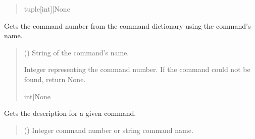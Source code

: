 \documentclass[letterpaper,10pt,english]{sphinxmanual}
\begin{document}
\begin{fulllineitems}
\begin{fulllineitems}
\begin{quote}
\begin{description}
\sphinxAtStartPar
tuple{[}int{]}|None

\end{description}\end{quote}

\end{fulllineitems}


\begin{fulllineitems}
\label{\detokenize{PodApi.Commands:PodApi.Commands.PodCommands.CommandSet.CommandNumberFromName}}
\pysigstartsignatures
{}
\pysigstopsignatures
\sphinxAtStartPar
Gets the command number from the command dictionary using the command’s name.
\begin{quote}\begin{description}
\sphinxAtStartPar
{} () \textendash{} String of the command’s name.

\sphinxAtStartPar
Integer representing the command number. If the command could not be found,                 return None.

\sphinxAtStartPar
int|None

\end{description}\end{quote}

\end{fulllineitems}


\begin{fulllineitems}
\label{\detokenize{PodApi.Commands:PodApi.Commands.PodCommands.CommandSet.Description}}
\pysigstartsignatures
{}
\pysigstopsignatures
\sphinxAtStartPar
Gets the description for a given command.
\begin{quote}\begin{description}
\sphinxAtStartPar
{} (\sphinxstyleliteralemphasis{\sphinxupquote{ | }}) \textendash{} Integer command number or string command name.


\end{description}
\end{quote}
\end{fulllineitems}
\end{fulllineitems}
\end{document}
